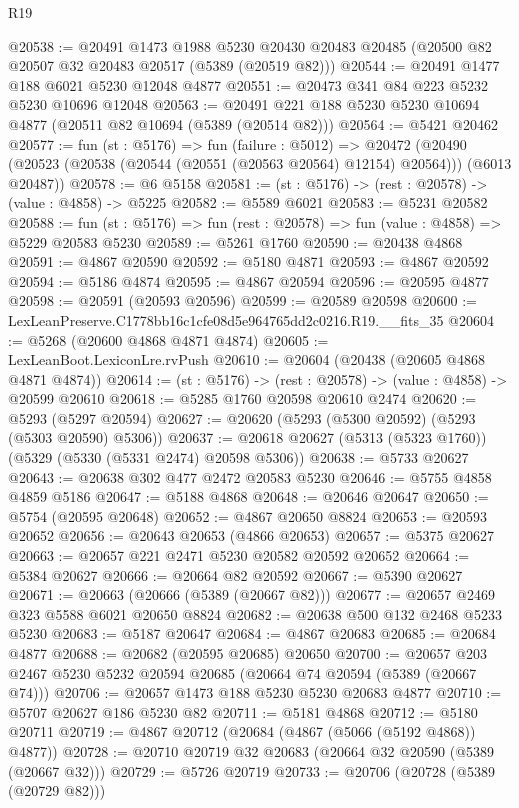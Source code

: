 \begin{lexlean}{R19}
\begin{coremodule}
@20538 := @20491
    @1473
    @1988
    @5230
    @20430
    @20483
    @20485
    (@20500 @82 @20507 @32 @20483 @20517 (@5389 (@20519 @82)))
@20544 := @20491 @1477 @188 @6021 @5230 @12048 @4877
@20551 := @20473 @341 @84 @223 @5232 @5230 @10696 @12048
@20563 := @20491 @221 @188 @5230 @5230 @10694 @4877 (@20511 @82 @10694 (@5389 (@20514 @82)))
@20564 := @5421 @20462
@20577 := fun (st : @5176) =>
  fun (failure : @5012) =>
  @20472 (@20490 (@20523 (@20538 (@20544 (@20551 (@20563 @20564) @12154) @20564))) (@6013 @20487))
@20578 := @6 @5158
@20581 := (st : @5176) -> (rest : @20578) -> (value : @4858) -> @5225
@20582 := @5589 @6021
@20583 := @5231 @20582
@20588 := fun (st : @5176) => fun (rest : @20578) => fun (value : @4858) => @5229 @20583 @5230
@20589 := @5261 @1760
@20590 := @20438 @4868
@20591 := @4867 @20590
@20592 := @5180 @4871
@20593 := @4867 @20592
@20594 := @5186 @4874
@20595 := @4867 @20594
@20596 := @20595 @4877
@20598 := @20591 (@20593 @20596)
@20599 := @20589 @20598
@20600 := LexLeanPreserve.C1778bb16c1cfe08d5e964765dd2c0216.R19.__fits_35
@20604 := @5268 (@20600 @4868 @4871 @4874)
@20605 := LexLeanBoot.LexiconLre.rvPush
@20610 := @20604 (@20438 (@20605 @4868 @4871 @4874))
@20614 := (st : @5176) -> (rest : @20578) -> (value : @4858) -> @20599 @20610
@20618 := @5285 @1760 @20598 @20610 @2474
@20620 := @5293 (@5297 @20594)
@20627 := @20620 (@5293 (@5300 @20592) (@5293 (@5303 @20590) @5306))
@20637 := @20618 @20627 (@5313 (@5323 @1760)) (@5329 (@5330 (@5331 @2474) @20598 @5306))
@20638 := @5733 @20627
@20643 := @20638 @302 @477 @2472 @20583 @5230
@20646 := @5755 @4858 @4859 @5186
@20647 := @5188 @4868
@20648 := @20646 @20647
@20650 := @5754 (@20595 @20648)
@20652 := @4867 @20650 @8824
@20653 := @20593 @20652
@20656 := @20643 @20653 (@4866 @20653)
@20657 := @5375 @20627
@20663 := @20657 @221 @2471 @5230 @20582 @20592 @20652
@20664 := @5384 @20627
@20666 := @20664 @82 @20592
@20667 := @5390 @20627
@20671 := @20663 (@20666 (@5389 (@20667 @82)))
@20677 := @20657 @2469 @323 @5588 @6021 @20650 @8824
@20682 := @20638 @500 @132 @2468 @5233 @5230
@20683 := @5187 @20647
@20684 := @4867 @20683
@20685 := @20684 @4877
@20688 := @20682 (@20595 @20685) @20650
@20700 := @20657 @203 @2467 @5230 @5232 @20594 @20685 (@20664 @74 @20594 (@5389 (@20667 @74)))
@20706 := @20657 @1473 @188 @5230 @5230 @20683 @4877
@20710 := @5707 @20627 @186 @5230 @82
@20711 := @5181 @4868
@20712 := @5180 @20711
@20719 := @4867 @20712 (@20684 (@4867 (@5066 (@5192 @4868)) @4877))
@20728 := @20710 @20719 @32 @20683 (@20664 @32 @20590 (@5389 (@20667 @32)))
@20729 := @5726 @20719
@20733 := @20706 (@20728 (@5389 (@20729 @82)))

\end{coremodule}
\end{lexlean}
